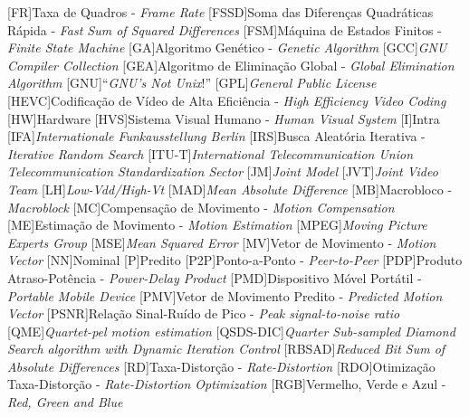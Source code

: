 \begin{acronym}
[FR]{Taxa de Quadros - \textit{Frame Rate}}
[FSSD]{Soma das Diferenças Quadráticas Rápida - \textit{Fast Sum of Squared Differences}}
[FSM]{Máquina de Estados Finitos - \textit{Finite State Machine}}
[GA]{Algoritmo Genético - \textit{Genetic Algorithm}}
[GCC]{\textit{GNU Compiler Collection}}
[GEA]{Algoritmo de Eliminação Global - \textit{Global Elimination Algorithm}}
[GNU]{``\textit{GNU's Not Unix}!''}
[GPL]{\textit{General Public License}}
[HEVC]{Codificação de Vídeo de Alta Eficiência - \textit{High Efficiency Video Coding}}
[HW]{Hardware}
[HVS]{Sistema Visual Humano - \textit{Human Visual System}}
[I]{Intra}
[IFA]{\textit{Internationale Funkausstellung Berlin}}
[IRS]{Busca Aleatória Iterativa - \textit{Iterative Random Search}}
[ITU-T]{\textit{International Telecommunication Union Telecommunication Standardization Sector}}
[JM]{\textit{Joint Model}}
[JVT]{\textit{Joint  Video Team}}
[LH]{\textit{Low-Vdd/High-Vt}}
[MAD]{\textit{Mean Absolute Difference}}
[MB]{Macrobloco - \textit{Macroblock}}
[MC]{Compensação de Movimento - \textit{Motion Compensation}}
[ME]{Estimação de Movimento - \textit{Motion Estimation}}
[MPEG]{\textit{Moving Picture Experts Group}}
[MSE]{\textit{Mean Squared Error}}
[MV]{Vetor de Movimento - \textit{Motion Vector}}
[NN]{Nominal}
[P]{Predito}
[P2P]{Ponto-a-Ponto - \textit{Peer-to-Peer}}
[PDP]{Produto Atraso-Potência - \textit{Power-Delay Product}}
[PMD]{Dispositivo Móvel Portátil - \textit{Portable Mobile Device}}
[PMV]{Vetor de Movimento Predito - \textit{Predicted Motion Vector}}
[PSNR]{Relação Sinal-Ruído de Pico - \textit{Peak signal-to-noise ratio}}
[QME]{\textit{Quartet-pel motion estimation}}
[QSDS-DIC]{\textit{Quarter Sub-sampled Diamond Search algorithm with Dynamic Iteration Control}}
[RBSAD]{\textit{Reduced Bit Sum of Absolute Differences}}
[RD]{Taxa-Distorção - \textit{Rate-Distortion}}
[RDO]{Otimização Taxa-Distorção - \textit{Rate-Distortion Optimization}}
[RGB]{Vermelho, Verde e Azul - \textit{Red, Green and Blue}}

\end{acronym}

